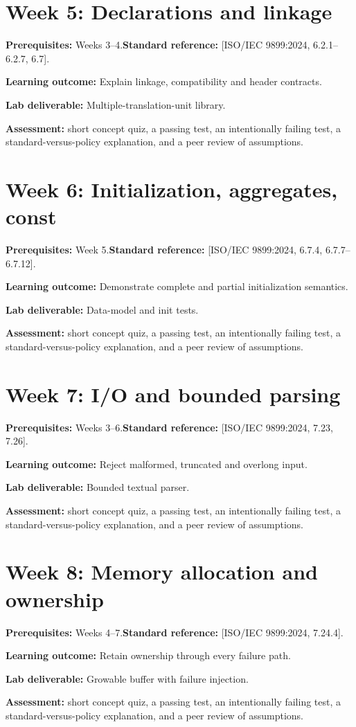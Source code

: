 \documentclass[10pt,letterpaper,oneside]{report}
\newcommand{\refcl}[1]{\textsf{\footnotesize[ISO/IEC 9899:2024, #1]}}
\begin{document}
\section{Week 5: Declarations and linkage}
\textbf{Prerequisites:} Weeks 3--4.\quad \textbf{Standard reference:} \refcl{6.2.1--6.2.7, 6.7}.\par\textbf{Learning outcome:} Explain linkage, compatibility and header contracts.\par\textbf{Lab deliverable:} Multiple-translation-unit library.\par\textbf{Assessment:} short concept quiz, a passing test, an intentionally failing test, a standard-versus-policy explanation, and a peer review of assumptions.

\section{Week 6: Initialization, aggregates, const}
\textbf{Prerequisites:} Week 5.\quad \textbf{Standard reference:} \refcl{6.7.4, 6.7.7--6.7.12}.\par\textbf{Learning outcome:} Demonstrate complete and partial initialization semantics.\par\textbf{Lab deliverable:} Data-model and init tests.\par\textbf{Assessment:} short concept quiz, a passing test, an intentionally failing test, a standard-versus-policy explanation, and a peer review of assumptions.

\section{Week 7: I/O and bounded parsing}
\textbf{Prerequisites:} Weeks 3--6.\quad \textbf{Standard reference:} \refcl{7.23, 7.26}.\par\textbf{Learning outcome:} Reject malformed, truncated and overlong input.\par\textbf{Lab deliverable:} Bounded textual parser.\par\textbf{Assessment:} short concept quiz, a passing test, an intentionally failing test, a standard-versus-policy explanation, and a peer review of assumptions.

\section{Week 8: Memory allocation and ownership}
\textbf{Prerequisites:} Weeks 4--7.\quad \textbf{Standard reference:} \refcl{7.24.4}.\par\textbf{Learning outcome:} Retain ownership through every failure path.\par\textbf{Lab deliverable:} Growable buffer with failure injection.\par\textbf{Assessment:} short concept quiz, a passing test, an intentionally failing test, a standard-versus-policy explanation, and a peer review of assumptions.
\end{document}
